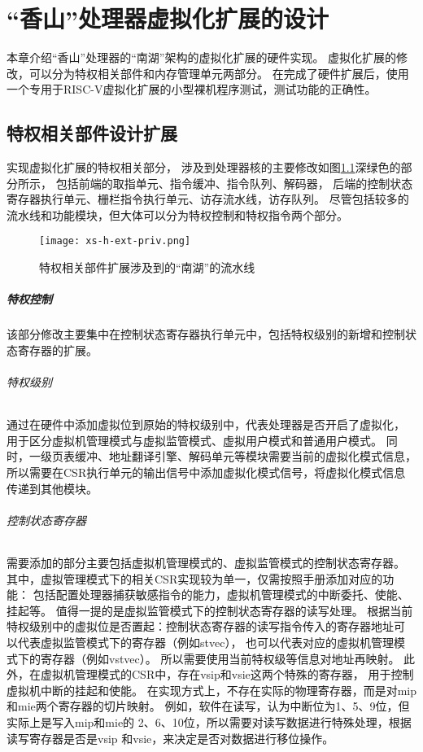 \chapter{“香山”处理器虚拟化扩展的设计}


本章介绍“香山”处理器的“南湖”架构的虚拟化扩展的硬件实现。
虚拟化扩展的修改，可以分为特权相关部件和内存管理单元两部分。
在完成了硬件扩展后，使用一个专用于RISC-V虚拟化扩展的小型裸机程序测试，测试功能的正确性。

\section{特权相关部件设计扩展}
实现虚拟化扩展的特权相关部分，
涉及到处理器核的主要修改如图\ref{fig:xs-h-ext-priv}深绿色的部分所示，
包括前端的取指单元、指令缓冲、指令队列、解码器，
后端的控制状态寄存器执行单元、栅栏指令执行单元、访存流水线，访存队列。
尽管包括较多的流水线和功能模块，但大体可以分为特权控制和特权指令两个部分。

\begin{figure}[htbp]
    \centering
\texttt{[image: xs-h-ext-priv.png]}
    \caption{特权相关部件扩展涉及到的“南湖”的流水线}
    \label{fig:xs-h-ext-priv}
\end{figure}

\paragraph{特权控制}
该部分修改主要集中在控制状态寄存器执行单元中，包括特权级别的新增和控制状态寄存器的扩展。

\subparagraph{特权级别}
通过在硬件中添加虚拟位到原始的特权级别中，代表处理器是否开启了虚拟化，
用于区分虚拟机管理模式与虚拟监管模式、虚拟用户模式和普通用户模式。
同时，一级页表缓冲、地址翻译引擎、解码单元等模块需要当前的虚拟化模式信息，
所以需要在CSR执行单元的输出信号中添加虚拟化模式信号，将虚拟化模式信息传递到其他模块。

\subparagraph{控制状态寄存器}
需要添加的部分主要包括虚拟机管理模式的、虚拟监管模式的控制状态寄存器。
其中，虚拟管理模式下的相关CSR实现较为单一，仅需按照手册添加对应的功能：
包括配置处理器捕获敏感指令的能力，虚拟机管理模式的中断委托、使能、挂起等。
值得一提的是虚拟监管模式下的控制状态寄存器的读写处理。
根据当前特权级别中的虚拟位是否置起：控制状态寄存器的读写指令传入的寄存器地址可
以代表虚拟监管模式下的寄存器（例如stvec），
也可以代表对应的虚拟机管理模式下的寄存器（例如vstvec）。
所以需要使用当前特权级等信息对地址再映射。
此外，在虚拟机管理模式的CSR中，存在vsip和vsie这两个特殊的寄存器，
用于控制虚拟机中断的挂起和使能。
在实现方式上，不存在实际的物理寄存器，而是对mip和mie两个寄存器的切片映射。
例如，软件在读写，认为中断位为1、5、9位，但实际上是写入mip和mie的
2、6、10位，所以需要对读写数据进行特殊处理，根据读写寄存器是否是vsip
和vsie，来决定是否对数据进行移位操作。

